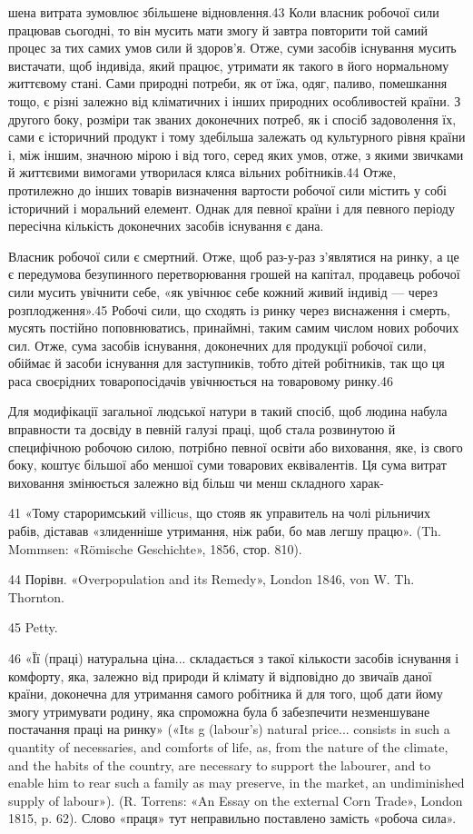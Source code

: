 шена витрата зумовлює збільшене відновлення.43 Коли власник
робочої сили працював сьогодні, то він мусить мати змогу й завтра
повторити той самий процес за тих самих умов сили й здоров’я.
Отже, суми засобів існування мусить вистачати, щоб індивіда,
який працює, утримати як такого в його нормальному життєвому
стані. Сами природні потреби, як от їжа, одяг, паливо, помешкання
тощо, є різні залежно від кліматичних і інших природних
особливостей країни. З другого боку, розміри так званих доконечних
потреб, як і спосіб задоволення їх, сами є історичний
продукт і тому здебільша залежать од культурного рівня країни
і, між іншим, значною мірою і від того, серед яких умов, отже,
з якими звичками й життєвими вимогами утворилася кляса вільних
робітників.44 Отже, протилежно до інших товарів визначення
вартости робочої сили містить у собі історичний і моральний
елемент. Однак для певної країни і для певного періоду пересічна
кількість доконечних засобів існування є дана.

Власник робочої сили є смертний. Отже, щоб раз-у-раз
з’являтися на ринку, а це є передумова безупинного перетворювання
грошей на капітал, продавець робочої сили мусить увічнити
себе, «як увічнює себе кожний живий індивід — через
розплодження».45 Робочі сили, що сходять із ринку через виснаження
і смерть, мусять постійно поповнюватись, принаймні,
таким самим числом нових робочих сил. Отже, сума засобів
існування, доконечних для продукції робочої сили, обіймає й
засоби існування для заступників, тобто дітей робітників, так
що ця раса своєрідних товаропосідачів увічнюється на товаровому
ринку.46

Для модифікації загальної людської натури в такий спосіб,
щоб людина набула вправности та досвіду в певній галузі праці,
щоб стала розвинутою й специфічною робочою силою, потрібно
певної освіти або виховання, яке, із свого боку, коштує більшої
або меншої суми товарових еквівалентів. Ця сума витрат виховання
змінюється залежно від більш чи менш складного харак-

41 «Тому староримський villicus, що стояв як управитель на чолі
рільничих рабів, діставав «злиденніше утримання, ніж раби, бо мав
легшу працю». (Th. Mommsen: «Römische Geschichte», 1856, стор. 810).

44    Порівн. «Overpopulation and its Remedy», London 1846, von W. Th.
Thornton.

45    Petty.

46 «Її (праці) натуральна ціна... складається з такої кількости засобів
існування і комфорту, яка, залежно від природи й клімату й відповідно
до звичаїв даної країни, доконечна для утримання самого робітника
й для того, щоб дати йому змогу утримувати родину, яка спроможна
була б забезпечити незменшуване постачання праці на ринку» («Its
g (labour’s) natural price... consists in such a quantity of necessaries, and
comforts of life, as, from the nature of the climate, and the habits of the
country, are necessary to support the labourer, and to enable him to rear
such a family as may preserve, in the market, an undiminished supply of
labour»). (R. Torrens: «An Essay on the external Corn Trade», London
1815, p. 62). Слово «праця» тут неправильно поставлено замість «робоча
сила».
